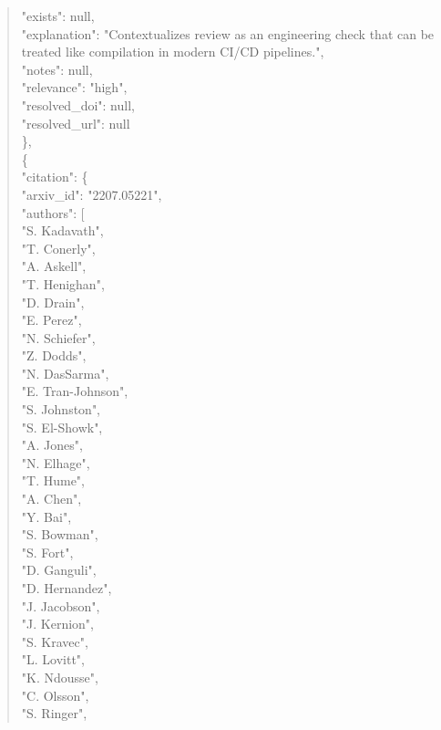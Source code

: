 \documentclass[11pt]{article}
\begin{document}
\begin{quote}
      "exists": null,\\
      "explanation": "Contextualizes review as an engineering check that can be treated like compilation in modern CI/CD pipelines.",\\
      "notes": null,\\
      "relevance": "high",\\
      "resolved\_doi": null,\\
      "resolved\_url": null\\
    \},\\
    \{\\
      "citation": \{\\
        "arxiv\_id": "2207.05221",\\
        "authors": [\\
          "S. Kadavath",\\
          "T. Conerly",\\
          "A. Askell",\\
          "T. Henighan",\\
          "D. Drain",\\
          "E. Perez",\\
          "N. Schiefer",\\
          "Z. Dodds",\\
          "N. DasSarma",\\
          "E. Tran-Johnson",\\
          "S. Johnston",\\
          "S. El-Showk",\\
          "A. Jones",\\
          "N. Elhage",\\
          "T. Hume",\\
          "A. Chen",\\
          "Y. Bai",\\
          "S. Bowman",\\
          "S. Fort",\\
          "D. Ganguli",\\
          "D. Hernandez",\\
          "J. Jacobson",\\
          "J. Kernion",\\
          "S. Kravec",\\
          "L. Lovitt",\\
          "K. Ndousse",\\
          "C. Olsson",\\
          "S. Ringer",\\

\end{quote}
\end{document}
